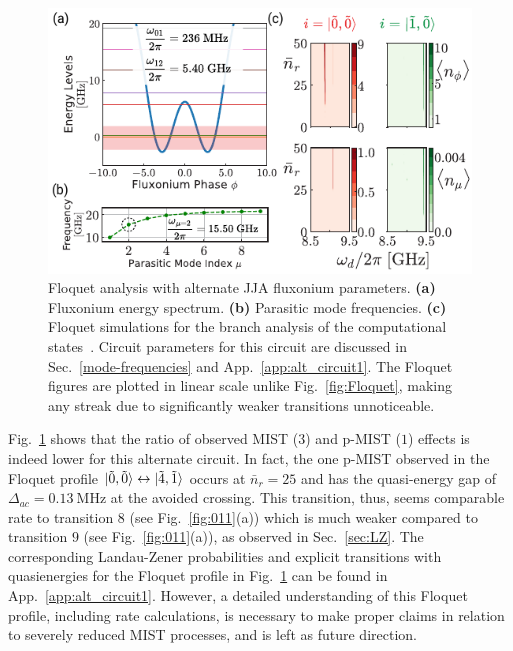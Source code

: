 \documentclass[%
reprint,
superscriptaddress,
 amsmath,amssymb,
 aps,
 prx,
longbibliography,
floatfix,
]{revtex4-2}
\newcommand{\singh}[1]{{\color{orange}{{}#1}}}%
\begin{document}
\begin{figure}[htb]
    \centering
    \includegraphics[width=\linewidth]{Figures/Floquet_Will.pdf}
    \caption{Floquet analysis with alternate JJA fluxonium parameters. \textbf{(a)} Fluxonium energy spectrum. \textbf{(b)} Parasitic mode frequencies. \textbf{(c)} Floquet simulations for the branch analysis of the computational states~\cite{ding2023high}. Circuit parameters for this circuit are discussed in Sec.~\ref{mode-frequencies} and App.~\ref{app:alt_circuit1}. The Floquet figures are plotted in linear scale unlike Fig.~\ref{fig:Floquet}, making any streak due to significantly weaker transitions \singh{($\Delta_{ac}<1 \ \mathrm{KHz}$)} unnoticeable.}
    \label{fig:Floquet1}
\end{figure}

Fig.~\ref{fig:Floquet1} shows that the ratio of observed MIST ($3$) and p-MIST ($1$) effects is indeed lower for this alternate circuit. In fact, the one p-MIST observed in the Floquet profile $\ket{\tilde{0},\tilde{0}}\leftrightarrow\ket{\tilde{4},\tilde{1}}$ occurs at $\bar n_r=25$ and has the quasi-energy gap of $\Delta_{ac}=0.13 \ \mathrm{MHz}$ at the avoided crossing. This transition, thus, seems comparable rate to transition $8$ (see Fig.~\ref{fig:011}(a)) which is much weaker compared to transition $9$ (see Fig.~\ref{fig:011}(a)), as observed in Sec.~\ref{sec:LZ}. The corresponding Landau-Zener probabilities and explicit transitions with quasienergies for the Floquet profile in Fig.~\ref{fig:Floquet1} can be found in App.~\ref{app:alt_circuit1}. However, a detailed understanding of this Floquet profile, including rate calculations, is necessary to make proper claims in relation to severely reduced MIST processes, and is left as future direction.
\end{document}
